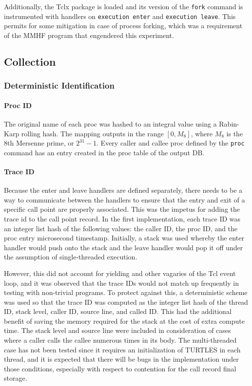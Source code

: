 \documentclass{article}[letter,10pt]
\begin{document}
{{{      Additionally, the Tclx package is loaded and its version of the \texttt{fork} command is instrumented
      with handlers on \texttt{execution enter} and \texttt{execution leave}. This permits for
      some mitigation in case of process forking, which was a requirement of the MMHF program that
      engendered this experiment.
    }
  }

  \subsection{Collection}{
    \subsubsection{Deterministic Identification}{
      \paragraph{Proc ID}{
        The original name of each proc was hashed to an integral value using a Rabin-Karp rolling hash\autocite{univhash}.
        The mapping outputs in the range $[0, M_8]$, where $M_8$ is the 8th Mersenne prime, or $2^{31}-1$.
        Every caller and callee proc defined by the \texttt{proc} command has an entry created in the proc
        table of the output DB.
      }
      \paragraph{Trace ID}{
        Because the enter and leave handlers are defined separately, there needs to be a way to communicate
        between the handlers to ensure that the entry and exit of a specific call point are properly associated.
        This was the impetus for adding the trace id to the call point record. In the first implementation,
        each trace ID was an integer list hash of the following values: the caller ID, the proc ID, and the
        proc entry microsecond timestamp. Initially, a stack was used whereby the enter handler would push
        onto the stack and the leave handler would pop it off under the assumption of single-threaded execution.

        However, this did not account for yielding and other vagaries of the Tcl event loop, and it was
        observed that the trace IDs would not match up frequently in testing with non-trivial programs.
        To protect against this, a deterministic scheme was used so that the trace ID was computed
        as the integer list hash of the thread ID, stack level, caller ID, source line, and called ID.
        This had the additional benefit of saving the memory required for the stack at the cost of extra compute time.
        The stack level and source line were included in consideration of cases where a caller calls the callee
        numerous times in its body. The multi-threaded case has not been tested since it requires an
        initialization of TURTLES in each thread, and it is expected that there will be bugs in the implementation
        under those conditions, especially with respect to contention for the call record final storage.
      }
    }

}}
\end{document}
